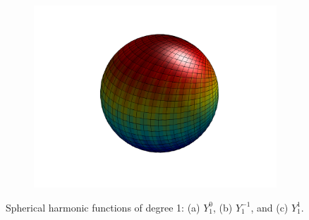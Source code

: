 \begin{figure}
\begin{subfigure}[b]{0.40\textwidth}
		\includegraphics[width=\textwidth]{figures/appendices/Y_1_1.png}
		\caption{}
	\end{subfigure}
\caption{Spherical harmonic functions of degree 1: (a) $Y_{1}^{0}$, (b) $Y_{1}^{-1}$, and (c) $Y_{1}^{1}$.}
\end{figure}

